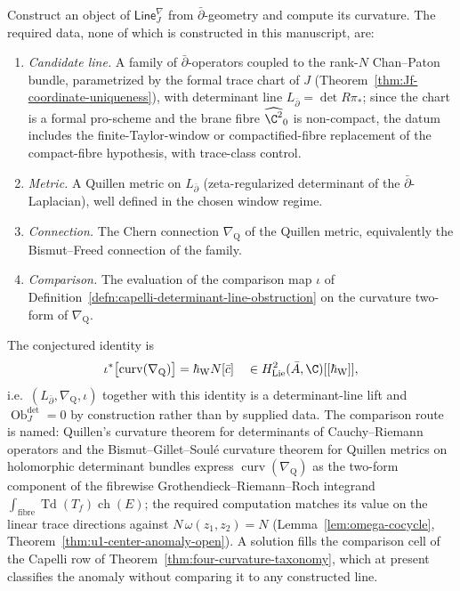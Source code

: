 \documentclass[11pt]{memoir}
\begin{document}
\begin{prob}
\label{prob:quillen-curvature-trace-chart}
  Construct an object of \(\mathsf{Line}^{\nabla}_J\) from
  \(\bar\partial\)-geometry and compute its curvature.  The required
  data, none of which is constructed in this manuscript, are:
  \begin{enumerate}
    \item \emph{Candidate line.}  A family of
      \(\bar\partial\)-operators coupled to the rank-\(N\) Chan--Paton
      bundle, parametrized by the formal trace chart of \(J\)
      (Theorem~\ref{thm:Jf-coordinate-uniqueness}), with determinant
      line \(L_{\bar\partial}=\det R\pi_*\); since the chart is a
      formal pro-scheme and the brane fibre \(\widehat{\C^2}_0\) is
      non-compact, the datum includes the finite-Taylor-window or
      compactified-fibre replacement of the compact-fibre hypothesis,
      with trace-class control.
    \item \emph{Metric.}  A Quillen metric on \(L_{\bar\partial}\)
      (zeta-regularized determinant of the
      \(\bar\partial\)-Laplacian), well defined in the chosen window
      regime.
    \item \emph{Connection.}  The Chern connection
      \(\nabla_{\mathrm{Q}}\) of the Quillen metric, equivalently the
      Bismut--Freed connection of the family.
    \item \emph{Comparison.}  The evaluation of the comparison map
      \(\iota\) of
      Definition~\ref{defn:capelli-determinant-line-obstruction} on
      the curvature two-form of \(\nabla_{\mathrm{Q}}\).
  \end{enumerate}
  The conjectured identity is
  \[
    \iota^*\bigl[\operatorname{curv}(\nabla_{\mathrm{Q}})\bigr]
    =\hbar_{\mathrm{W}}N[\bar c]
    \quad\in H^2_{\mathrm{Lie}}(\bar A,\C)[[\hbar_{\mathrm{W}}]],
  \]
  i.e.\ \((L_{\bar\partial},\nabla_{\mathrm{Q}},\iota)\) together with
  this identity is a determinant-line lift and
  \(\operatorname{Ob}^{\det}_J=0\) by construction rather than by
  supplied data.  The comparison route is named: Quillen's curvature
  theorem for determinants of Cauchy--Riemann operators
  \cite{quillen-determinants-cr} and the Bismut--Gillet--Soul\'e
  curvature theorem for Quillen metrics on holomorphic determinant
  bundles \cite{bismut-gillet-soule-III} express
  \(\operatorname{curv}(\nabla_{\mathrm{Q}})\) as the two-form
  component of the fibrewise Grothendieck--Riemann--Roch integrand
  \(\int_{\mathrm{fibre}}\operatorname{Td}(T_f)\operatorname{ch}(E)\);
  the required computation matches its value on the linear trace
  directions against
  \(N\,\omega(z_1,z_2)=N\)
  (Lemma~\ref{lem:omega-cocycle},
  Theorem~\ref{thm:u1-center-anomaly-open}).  A solution fills the
  comparison cell of the Capelli row of
  Theorem~\ref{thm:four-curvature-taxonomy}, which at present
  classifies the anomaly without comparing it to any constructed
  line.
\end{prob}
\end{document}
